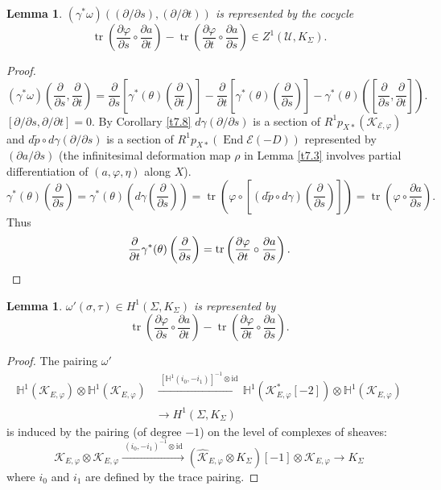 \documentclass[12pt,a4paper,oneside,english]{smfart}
\newtheorem{lem}[thm]{Lemma}
\theoremstyle{definition}
\theoremstyle{remark}
\DeclareMathOperator{\End}{End}
\DeclareMathOperator{\tr}{tr}
\newcommand{\cE}{\mathcal{E}}
\newcommand{\KK}{\mathscr{K}}
\newcommand{\HH}{\mathbb{H}}
\begin{document}
\begin{lem}\label{t7.13}
$(\gamma^*\omega)((\partial/\partial s), (\partial/\partial t))$ is represented by the cocycle
\[
\tr\left(\frac{\partial \varphi}{\partial s} \circ \frac{\partial a}{\partial t}\right) - \tr\left(\frac{\partial \varphi}{\partial t} \circ \frac{\partial a}{\partial s}\right) \in Z^1(\mathcal{U}, K_\Sigma).
\]
\end{lem}

\begin{proof}
\[
(\gamma^*\omega)\left(\frac{\partial}{\partial s}, \frac{\partial}{\partial t}\right) = \frac{\partial}{\partial s}\left[\gamma^*(\theta)\left(\frac{\partial}{\partial t}\right)\right] - \frac{\partial}{\partial t}\left[\gamma^*(\theta)\left(\frac{\partial}{\partial s}\right)\right] - \gamma^*(\theta)\left(\left[\frac{\partial}{\partial s}, \frac{\partial}{\partial t}\right]\right).
\]
$[\partial/\partial s, \partial/\partial t] = 0$. By Corollary \ref{t7.8} $d\gamma(\partial/\partial s)$ is a section of $R^1 p_{X*}(\KK_{\cE, \varphi})$ and $d\tilde{p} \circ d\gamma(\partial/\partial s)$ is a section of $R^1 p_{X*}(\End \cE(-D))$ represented by $(\partial a/\partial s)$ (the infinitesimal deformation map $\rho$ in Lemma \ref{t7.3} involves partial differentiation of $(a, \varphi, \eta)$ along $X$).
\[
\gamma^*(\theta)\left(\frac{\partial}{\partial s}\right) = \gamma^*(\theta)\left(d\gamma\left(\frac{\partial}{\partial s}\right)\right) = \tr\left(\varphi \circ \left[(d\tilde{p} \circ d\gamma)\left(\frac{\partial}{\partial s}\right)\right]\right) = \tr\left(\varphi \circ \frac{\partial a}{\partial s}\right).
\]
Thus
\[
\frac{\partial}{\partial t} \gamma^*(\theta)\left(\frac{\partial}{\partial s}\right) = \tr\left(\frac{\partial \varphi}{\partial t} \circ \frac{\partial a}{\partial s}\right). \qedhere
\]
\end{proof}

\begin{lem}\label{t7.14}
$\omega'(\sigma, \tau) \in H^1(\Sigma, K_\Sigma)$ is represented by
\[
\tr\left(\frac{\partial \varphi}{\partial s} \circ \frac{\partial a}{\partial t}\right) - \tr\left(\frac{\partial \varphi}{\partial t} \circ \frac{\partial a}{\partial s}\right).
\]
\end{lem}

\begin{proof}
The pairing $\omega'$
\begin{align*}
\HH^1(\KK_{E, \varphi}) \otimes \HH^1(\KK_{E, \varphi})
&\xrightarrow{\ [\HH^1(i_0, -i_1)]^{-1} \otimes \mathrm{id}\ } \HH^1(\KK^*_{E, \varphi}[-2]) \otimes \HH^1(\KK_{E, \varphi}) \\
&\longrightarrow H^1(\Sigma, K_\Sigma)
\end{align*}
is induced by the pairing (of degree $-1$) on the level of complexes of sheaves:
\[
\KK_{E, \varphi} \otimes \KK_{E, \varphi} \xrightarrow{\ (i_0, -i_1)^{-1} \otimes \mathrm{id}\ } (\widehat{\KK}_{E, \varphi} \otimes K_\Sigma)[-1] \otimes \KK_{E, \varphi} \to K_\Sigma
\]
where $i_0$ and $i_1$ are defined by the trace pairing.
\end{proof}
\end{document}

